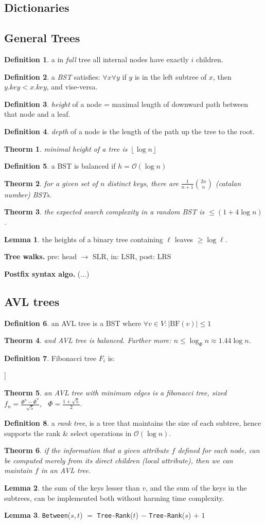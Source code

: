 \documentclass[]{article}
\newcommand\compactsubsection[1]        {\vspace{-10pt}\subsection{#1}\vspace{-5pt}}
\newcommand\compactsection   [1]        {\vspace{-10pt}\section{#1}\vspace{-5pt}}
\newcommand\subsectionrightaftersection {\vspace{10pt}}
\newcommand\oc    {\mathcal{O}}
\newcommand\rf    {\right\rfloor}
\newcommand\lf    {\left\lfloor}
\newcommand\floor [1] {\lf #1 \rf}
\newcommand\co        {\colon}
\newcommand\logn      {\log n}
\newcommand\sof[1]    {\left | #1 \right |}
\newtheorem{Theorem}{Theorm}
\theoremstyle{definition}
\newtheorem{Definition}{Definition}
\newtheorem{Lemma}{Lemma}
\newcommand\theo  [1] {\begin{Theorem}#1\end{Theorem}}
\newcommand\defi  [1] {\begin{Definition}#1\end{Definition}}
\newcommand\lem   [1] {\begin{Lemma}#1\end{Lemma}}
\begin{document}
\begin{multicols}{4}
		\compactsection{Dictionaries}\subsectionrightaftersection
			\compactsubsection{General Trees}
				\defi{a in \textit{full} tree all internal nodes have exactly $i$ children. }
				\defi{a \textit{BST} satisfies: $\forall x \forall y$ if $y$ is in the left subtree of $x$, then $y.key < x.key$, and vise-versa. }
				\defi{\textit{height} of a node = maximal length of downward path between that node and a leaf. }
				\defi{\textit{depth} of a node is the length of the path up the tree to the root. }
				\theo{minimal height of a tree is $\floor{\log n}$}
				\defi{a BST is balanced if $h = \oc(\logn)$}
				\theo{for a given set of $n$ distinct keys, there are $\frac{1}{n + 1}\binom{2n}{n}$ (catalan number) BSTs. }
				\theo{the expected search complexity in a random BST is $\le (1 + 4 \logn)$. }
				\lem{the heights of a binary tree containing $\ell$ leaves $\ge \log \ell$. }
				
				\textbf{Tree walks. }pre: head $\to$ SLR, in: LSR, post: LRS
				
				\textbf{Postfix syntax algo. }(...) %
				
			\compactsubsection{AVL trees}
				\defi{an AVL tree is a BST where $\forall v \in V \co \sof{\mathrm{BF}(v)} \le 1$}
				\theo{and AVL tree is balanced. Further more: $n \le \log_{\Phi}n \approx 1.44\logn$. }
				\defi{Fibonacci tree $F_i$ is: \\ \begin{center}
						\begin{forest}
							[$F_i$ [$F_{i -1}$] [$F_{i - 2}$]]
						\end{forest}
				\end{center}}
				\theo{an AVL tree with minimum edges is a fibonacci tree, sized $f_n = \frac{\Phi^n - \bar \Phi^n}{\sqrt 5}$, \ $\Phi = \frac{1 + \sqrt 5}{2}$. }
				
				
				\defi{a \textit{rank tree}, is a tree that maintains the size of each subtree, hence supports the rank \& select operations in $\oc(\logn)$. }
				
				\theo{if the information that a given attribute $f$ defined for each node, can be computed merely from its direct children (\textit{local attribute}), then we can maintain $f$ in an AVL tree. }
				\lem{the sum of the keys lesser than $v$, and the sum of the keys in the subtrees, can be implemented both without harming time complexity. }
				\lem{\texttt{Between}($s, t$) $=$ \texttt{Tree-Rank}($t$) $-$ \texttt{Tree-Rank}($s$) $+$ $1$}
				

\end{multicols}
\end{document}
